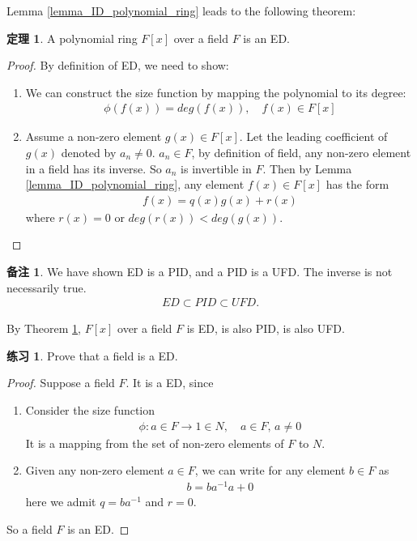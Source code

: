 \documentclass[utf8]{ctexbook}
\theoremstyle{definition}
\newtheorem{prototheorem}{定理}[section]
\newenvironment{theorem}
   {\colorlet{shadecolor}{red!30}\begin{shaded}\begin{prototheorem}}
   {\end{prototheorem}\end{shaded}}
\newtheorem{memo}{备注}[section]
\newtheorem{exercise}{练习}[section]
\begin{document}
Lemma \ref{lemma_ID_polynomial_ring} leads to the following theorem:

\begin{theorem}
\label{theorem_Polynomial_ring_over_field_is_ED}
A polynomial ring $F[x]$ over a field $F$ is an ED.
\end{theorem}

\begin{proof}
By definition of ED, we need to show:
\begin{enumerate}
\item{We can construct the size function by mapping the polynomial to its degree:
\begin{align*}
\phi(f(x)) = deg(f(x)), \quad f(x) \in F[x]
\end{align*}
}
\item{
Assume a non-zero element $g(x) \in F[x]$. Let the leading coefficient of $g(x)$ denoted by $a_n \neq 0$. $a_n \in F$, by definition of field, any non-zero element in a field has its inverse. So $a_n$ is invertible in $F$. Then by Lemma \ref{lemma_ID_polynomial_ring}, any element $f(x) \in F[x]$ has the form
\begin{align*}
f(x) = q(x) g(x) + r(x)
\end{align*}
where $r(x) = 0$ or $deg(r(x)) < deg(g(x))$.
}
\end{enumerate}

\end{proof}

\begin{memo}
We have shown ED is a PID, and a PID is a UFD. The inverse is not necessarily true.
\begin{align*}
ED \subset PID \subset UFD .
\end{align*}

By Theorem \ref{theorem_Polynomial_ring_over_field_is_ED}, $F[x]$ over a field $F$ is ED, is also PID, is also UFD.

\end{memo}

\begin{exercise}
Prove that a field is a ED.
\end{exercise}

\begin{proof}
Suppose a field $F$. It is a ED, since
\begin{enumerate}
\item{
Consider the size function
\begin{align*}
\phi: a \in F \longrightarrow 1 \in N, \quad a \in F, \, a \neq 0
\end{align*}
It is a mapping from the set of non-zero elements of $F$ to $N$.
}
\item{
Given any non-zero element $a \in F$, we can write for any element $b \in F$ as
\begin{align*}
b = b a^{-1} a + 0
\end{align*}
here we admit $q = b a^{-1}$ and $r=0$.
}
\end{enumerate}

So a field $F$ is an ED.
\end{proof}
\end{document}
